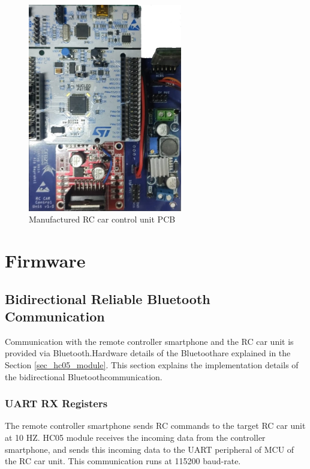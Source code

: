 \begin{figure}[!htbp]
    \centering
    \includegraphics[width=0.6\textwidth]{Imgs/pcb_manufactured.jpeg}
    \caption{\label{fig:custom_pcb_manufactured}Manufactured RC car control unit PCB}
\end{figure}


\section{Firmware} \label{sec_firmware_design}

\subsection{Bidirectional Reliable Bluetooth Communication} \label{sec_bluetooth_comm}

Communication with the remote controller smartphone and the RC car unit is provided via Bluetooth\texttrademark.\;Hardware details of the Bluetooth\texttrademark\;are explained in the Section \ref{sec_hc05_module}. This section explains the implementation details of the bidirectional Bluetooth\texttrademark\;communication.

\subsubsection{UART RX Registers} \label{sec_receive_rc_command}

The remote controller smartphone sends RC commands to the target RC car unit at 10 HZ. HC05 module receives the incoming data from the controller smartphone, and sends this incoming data to the UART peripheral of MCU of the RC car unit. This communication runs at 115200 baud-rate.

